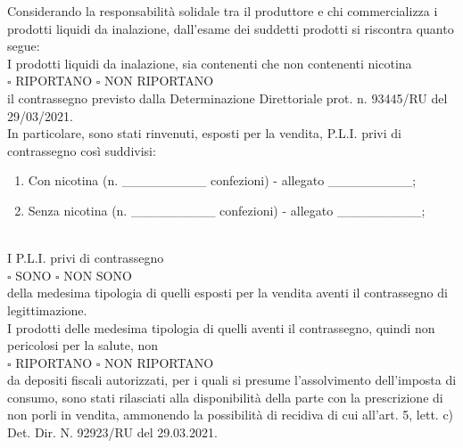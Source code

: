 \documentclass[12pt]{article}
\begin{document}
Considerando la responsabilità solidale tra il produttore e chi commercializza i prodotti liquidi da inalazione, dall’esame dei suddetti prodotti si riscontra quanto segue:\\
I prodotti liquidi da inalazione, sia contenenti che non contenenti nicotina \\
\begin{math}\square\end{math} RIPORTANO \begin{math}\square\end{math} NON RIPORTANO\\
il contrassegno previsto dalla Determinazione Direttoriale prot. n. 93445/RU del 29/03/2021.\\
In particolare, sono stati rinvenuti, esposti per la vendita, P.L.I. privi di contrassegno così suddivisi:
\begin{enumerate}[label=\begin{math}\square\end{math}]
    \item Con nicotina (n. \_\_\_\_\_\_\_\_\_ confezioni) - allegato \_\_\_\_\_\_\_\_\_;
    \item Senza nicotina (n. \_\_\_\_\_\_\_\_\_ confezioni) - allegato \_\_\_\_\_\_\_\_\_;
\end{enumerate}
\\
I P.L.I. privi di contrassegno\\
\begin{math}\square\end{math} SONO \begin{math}\square\end{math} NON SONO\\
della medesima tipologia di quelli esposti per la vendita aventi il contrassegno di legittimazione.\\
I prodotti delle medesima tipologia di quelli aventi il contrassegno, quindi non pericolosi per la salute, non \\
\begin{math}\square\end{math} RIPORTANO \begin{math}\square\end{math} NON RIPORTANO\\
da depositi fiscali autorizzati, per i quali si presume l’assolvimento dell’imposta di consumo, sono stati rilasciati alla disponibilità della parte con la prescrizione di non porli in vendita, ammonendo la possibilità di recidiva di cui all’art. 5, lett. c) Det. Dir. N. 92923/RU del 29.03.2021.
\end{document}
